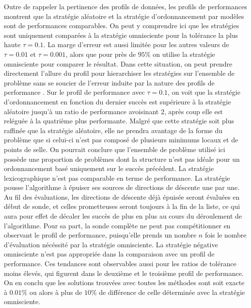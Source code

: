 \documentclass[letterpaper]{scrartcl}
\begin{document}
		Outre de rappeler la pertinence des profils de données, les profils de performances montrent que la stratégie aléatoire et la stratégie d'ordonnancement par modèles sont de performances comparables. On peut y comprendre ici que les stratégies sont uniquement comparées à la stratégie omnisciente pour la tolérance la plus haute $\tau = 0.1$. La marge d'erreur est aussi limitée pour les autres valeurs de $\tau = 0.01$ et $\tau = 0.001$, alors que pour près de $95\%$ on utilise la stratégie omnisciente pour comparer le résultat. Dans cette situation, on peut prendre directement l'allure du profil pour hierarchiser les stratégies sur l'ensemble de problème sans se soucier de l'erreur induite par la nature des profils de performance \cite{GoSc2016}. Sur le profil de performance avec $\tau = 0.1$, on voit que la stratégie d'ordonnancement en fonction du dernier succès est supérieure à la stratégie aléatoire jusqu'à un ratio de performance avoisinant $2$, après coup elle est reléguée à la quatrième plus performante. Malgré que cette stratégie soit plus raffinée que la stratégie aléatoire, elle ne prendra avantage de la forme du problème que si celui-ci n'est pas composé de plusieurs minimums locaux et de points de selle. On pourrait conclure que l'ensemble de problème utilisé ici possède une proportion de problèmes dont la structure n'est pas idéale pour un ordonnancement basé uniquement sur le succès précédent. La stratégie lexicographique n'est pas comparable en terme de performance. La stratégie pousse l'algorithme à épuiser ses sources de directions de déscente une par une. Au fil des évaluations, les directions de déscente déjà épuisée seront évaluées en début de sonde, et celles prometteuses seront toujours à la fin de la liste, ce qui aura pour effet de décaler les succès de plus en plus au cours du déroulement de l'algorithme. Pour sa part, la sonde complète ne peut pas compétitionner en observant le profil de performance, puisqu'elle prends un nombre $n$ fois le nombre d'évaluation nécéssité par la stratégie omnisciente. La stratégie négative omnisciente n'est pas appropriée dans la comparaison avec un profil de performance. Ces tendances sont observables aussi pour les ratios de tolérance moins élevés, qui figurent dans le deuxième et le troisième profil de performance. On en conclu que les solutions trouvées avec toutes les méthodes sont soit exacte à $0.01\%$ ou alors à plus de $10\%$ de différence de celle déterminée avec la stratégie omnisciente.  \\
\end{document}

